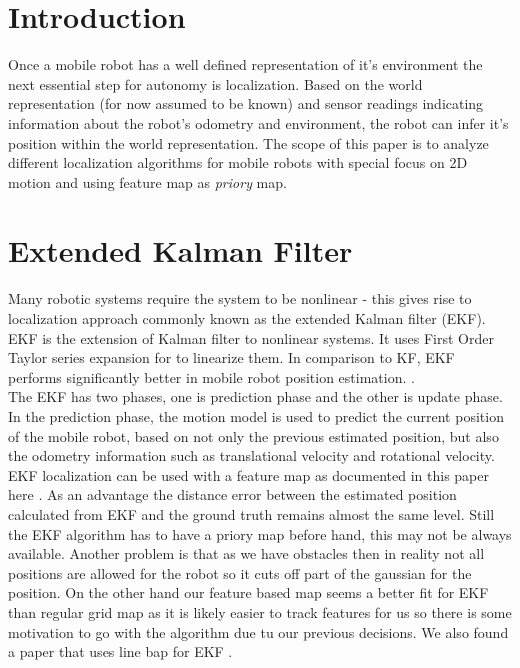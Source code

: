 \documentclass[12pt, a4paper, onecolumn]{article}
\begin{document}
\maketitle

\section{Introduction}

Once a mobile robot has a well defined representation of it's environment the next essential step for autonomy is localization.
Based on the world representation (for now assumed to be known) and sensor readings indicating information about the robot's odometry and environment, the robot can infer it's position within the world representation. 
The scope of this paper is to analyze different localization algorithms for mobile robots with special focus on 2D motion and using feature map as \emph{priory} map.

\section{Extended Kalman Filter}

Many robotic systems require the system to be nonlinear - this gives rise to localization approach commonly known as the extended Kalman filter (EKF).
EKF is the extension of Kalman filter to nonlinear systems. 
It uses First Order Taylor series expansion for to linearize them.
In comparison to KF, EKF performs significantly better in mobile robot position estimation. \cite{Suliman2010}. \\

The EKF has two phases, one is prediction phase and the other is update phase. 
In the prediction phase, the motion model is used to predict the current position of the mobile robot, based on not only the previous estimated position, but also the odometry information such as translational velocity and rotational velocity. \cite{featureEKF} \\

EKF localization can be used with a feature map as documented in this paper here \cite{featureEKF}. 
As an advantage the distance error between the estimated position calculated from EKF and the ground truth remains almost the same level. 
Still the EKF algorithm has to have a priory map before hand, this may not be always available. \cite{featureEKF}
Another problem is that as we have obstacles then in reality not all positions are allowed for the robot so it cuts off part of the gaussian for the position.
On the other hand our feature based map seems a better fit for EKF than regular grid map as it is likely easier to track features for us so there is some motivation to go with the algorithm due tu our previous decisions.
We also found a paper that uses line bap for EKF \cite{lineEKF}.
\end{document}
